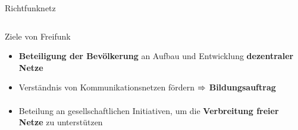 \documentclass[t]{beamer}
\begin{document}
\begin{frame}{Richtfunknetz}
\begin{columns}
\begin{column}{0.25\textwidth}
\begin{center}
        \end{center}
      \end{column}
    \end{columns}
  \end{frame}


  \begin{frame}{Ziele von Freifunk}
    \begin{itemize}
      \item \textbf{Beteiligung der Bevölkerung} an Aufbau und Entwicklung \textbf{dezentraler Netze}
      \item Verständnis von Kommunikationsnetzen fördern $\xRightarrow{}$ \textbf{Bildungsauftrag}
      \item Beteilung an gesellschaftlichen Initiativen, um die \textbf{Verbreitung freier Netze} zu unterstützen
    \end{itemize}
  \end{frame}
\end{document}
